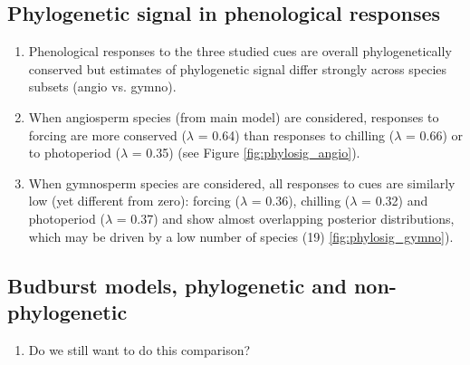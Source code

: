 \documentclass{article}\usepackage[]{graphicx}\usepackage[]{color}
\begin{document}
\subsection*{Phylogenetic signal in phenological responses}
\begin{enumerate}
\item Phenological responses to the three studied cues are overall phylogenetically conserved but estimates of phylogenetic signal differ strongly across species subsets (angio vs. gymno).
\item When angiosperm species (from main model) are considered, responses to forcing are more conserved ($\lambda$ = 0.64) than responses to chilling ($\lambda$ = 0.66) or to photoperiod ($\lambda$ = 0.35) (see Figure \ref{fig:phylosig_angio}).  

\item When gymnosperm species are considered, all responses to cues are similarly low (yet different from zero): forcing ($\lambda$ = 0.36), chilling ($\lambda$ = 0.32) and photoperiod ($\lambda$ = 0.37) and show almost overlapping posterior distributions, which may be driven by a low number of species (19) \ref{fig:phylosig_gymno}).  


\end{enumerate}


\subsection*{Budburst models, phylogenetic and non-phylogenetic}
\begin{enumerate}
\item Do we still want to do this comparison?
\end{enumerate}
\end{document}
